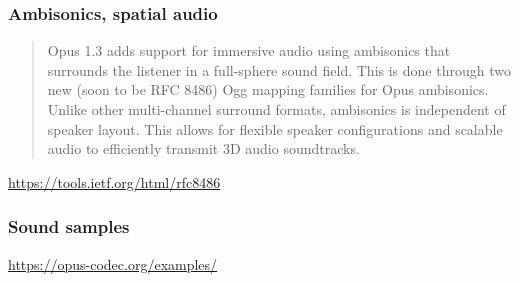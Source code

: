 \documentclass{beamer}
\begin{document}
\begin{frame}
	\frametitle{Ambisonics, spatial audio}
	\begin{quote}
		Opus 1.3 adds support for immersive audio using ambisonics that surrounds the listener in a full-sphere sound field. This is done through two new (soon to be RFC 8486) Ogg mapping families for Opus ambisonics. Unlike other multi-channel surround formats, ambisonics is independent of speaker layout. This allows for flexible speaker configurations and scalable audio to efficiently transmit 3D audio soundtracks.
	\end{quote}
	\href{https://tools.ietf.org/html/rfc8486}{https://tools.ietf.org/html/rfc8486}
\end{frame}


\begin{frame}
	\frametitle{Sound samples}
	\href{https://opus-codec.org/examples/}{https://opus-codec.org/examples/}
\end{frame}
\end{document}
